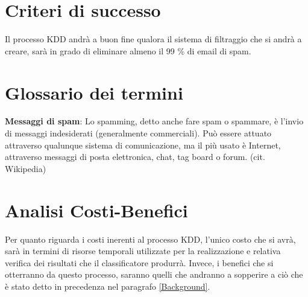 \section{Criteri di successo}
	Il processo KDD andrà a buon fine qualora il sistema di filtraggio che si andrà a creare, sarà in grado di eliminare almeno il 99 \% di email di spam.
\section{Glossario dei termini}
\textbf{Messaggi di spam}: Lo spamming, detto anche fare spam o spammare, è l'invio di messaggi indesiderati (generalmente commerciali). Può essere attuato attraverso qualunque sistema di comunicazione, ma il più usato è Internet, attraverso messaggi di posta elettronica, chat, tag board o forum. (cit. Wikipedia)\cite{wiki:Spam}

\section{Analisi Costi-Benefici}
Per quanto riguarda i costi inerenti al processo KDD, l'unico costo che si avrà, sarà in termini di risorse temporali utilizzate per la realizzazione e relativa verifica dei risultati che il classificatore produrrà.
Invece, i benefici che si otterranno da questo processo, saranno quelli che andranno a sopperire a ciò che è stato detto in precedenza nel paragrafo \ref{Background}.

